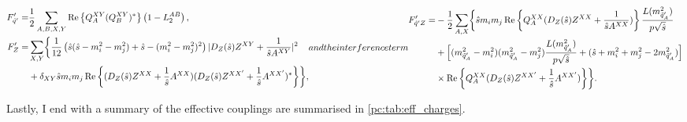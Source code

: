 \documentclass[../main.tex]{subfiles}
\begin{document}
\begin{subequations}
  \begin{align}
    \label{pc:eq:CC_eff_coupling_Fq}
    F^{\prime}_{\tilde{q}^\prime} = & \frac{1}{2} \sum_{A,B,X,Y}  \Re{Q_A^{XY} (Q_B^{XY})^\ast} \pclosed{1 - L_2^{AB}},                                                                            \\
    \label{pc:eq:CC_eff_coupling_FZ}
    \nonumber
    F^{\prime}_{Z} =                & \sum_{X,Y} \biggl\{\frac{1}{12} \pclosed{\hat{s}(\hat{s}-m_i^2-m_j^2) + \hat{s} - (m_i^2-m_j^2)^2} |D_Z(\hat{s})Z^{XY} + \frac{1}{\hat{s}A^{XY}}|^2          \\
                                    & + \delta_{XY} \hat{s}m_i m_j \Re{(D_Z(\hat{s}) Z^{XX} + \frac{1}{\hat{s}}A^{XX}) (D_Z(\hat{s})Z^{XX^\prime} + \frac{1}{\hat{s}}A^{XX^\prime})^\ast}\biggr\},
  \end{align}
  and the interference term
  \begin{align}
    \label{pc:eq:CC_eff_coupling_FqZ}
    \nonumber
    F^\prime_{\tilde{q}^\prime Z} = & -\frac{1}{2} \sum_{A,X} \biggl\{
    \hat{s} m_i m_j \Re{Q_{A}^{XX} (D_Z(\hat{s})Z^{XX} + \frac{1}{\hat{s}A^{XX}})}\frac{L(m_{\tilde{q}^\prime_A}^2)}{p \sqrt{\hat{s}}}                                                                                            \\
    \nonumber
                                    & + \Bigl[(m_{\tilde{q}^\prime_A}^2-m_i^2)(m_{\tilde{q}^\prime_A}^2-m_j^2) \frac{L(m_{\tilde{q}^\prime_A}^2)}{p \sqrt{\hat{s}}} + (\hat{s} + m_i^2 + m_j^2 - 2m_{\tilde{q}^\prime_A}^2)\Bigr] \\
                                    & \times\Re{Q_{A}^{XX} (D_Z(\hat{s})Z^{XX^\prime} + \frac{1}{\hat{s}}A^{XX^\prime})}
    \biggr\}.
  \end{align}
\end{subequations}

Lastly, I end with a summary of the effective couplings are summarised in \cref{pc:tab:eff_charges}.
\end{document}

